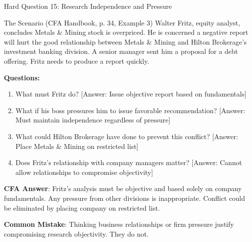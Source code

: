 \documentclass{beamer}
\begin{document}
	\begin{frame}{Hard Question 15: Research Independence and Pressure}
		\begin{block}{The Scenario (CFA Handbook, p. 34, Example 3)}
			Walter Fritz, equity analyst, concludes Metals \& Mining stock is overpriced. He is concerned a negative report will hurt the good relationship between Metals \& Mining and Hilton Brokerage's investment banking division. A senior manager sent him a proposal for a debt offering. Fritz needs to produce a report quickly.
		\end{block}
		
		\vspace{0.2cm}
		\textbf{Questions:}
		\begin{enumerate}
			\item What must Fritz do? \textcolor{cfared}{[Answer: Issue objective report based on fundamentals]}
			\item What if his boss pressures him to issue favorable recommendation? \textcolor{cfared}{[Answer: Must maintain independence regardless of pressure]}
			\item What could Hilton Brokerage have done to prevent this conflict? \textcolor{cfared}{[Answer: Place Metals \& Mining on restricted list]}
			\item Does Fritz's relationship with company managers matter? \textcolor{cfared}{[Answer: Cannot allow relationships to compromise objectivity]}
		\end{enumerate}
		
		\vspace{0.2cm}
		\textcolor{cfablue}{\textbf{CFA Answer}}: Fritz's analysis must be objective and based solely on company fundamentals. Any pressure from other divisions is inappropriate. Conflict could be eliminated by placing company on restricted list.
		
		\vspace{0.1cm}
		\textcolor{cfared}{\textbf{Common Mistake}}: Thinking business relationships or firm pressure justify compromising research objectivity. They do not.
	\end{frame}
	
\end{document}
